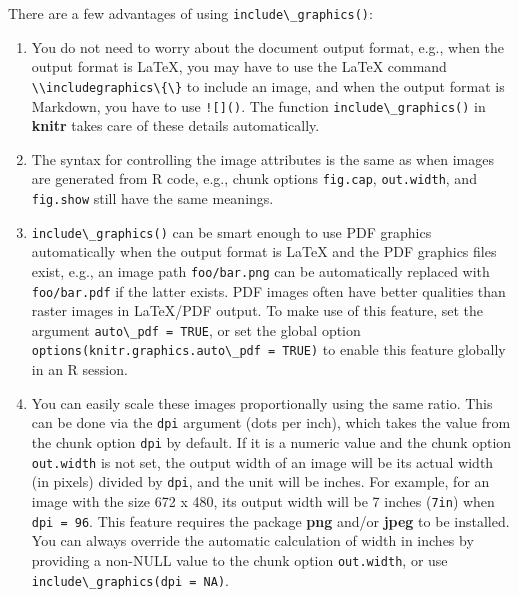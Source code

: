 \documentclass[doctor,openright,twoside]{sjtuthesis}
\providecommand{\tightlist}{%
    \setlength{\itemsep}{0pt}\setlength{\parskip}{0pt}}
\newcommand{\passthrough}[1]{#1}
\theoremstyle{plain}
\theoremstyle{definition}
\theoremstyle{remark}
\theoremstyle{ocrenumbox}
\theoremstyle{plain}
\begin{document}
There are a few advantages of using \passthrough{\lstinline!include\_graphics()!}:

\begin{enumerate}
\def\labelenumi{\arabic{enumi}.}
\tightlist
\item
  You do not need to worry about the document output format, e.g., when the output format is LaTeX, you may have to use the LaTeX command \passthrough{\lstinline!\\includegraphics\{\}!} to include an image, and when the output format is Markdown, you have to use \passthrough{\lstinline"![]()"}. The function \passthrough{\lstinline!include\_graphics()!} in \textbf{knitr} takes care of these details automatically.
\item
  The syntax for controlling the image attributes is the same as when images are generated from R code, e.g., chunk options \passthrough{\lstinline!fig.cap!}, \passthrough{\lstinline!out.width!}, and \passthrough{\lstinline!fig.show!} still have the same meanings.
\item
  \passthrough{\lstinline!include\_graphics()!} can be smart enough to use PDF graphics automatically when the output format is LaTeX and the PDF graphics files exist, e.g., an image path \passthrough{\lstinline!foo/bar.png!} can be automatically replaced with \passthrough{\lstinline!foo/bar.pdf!} if the latter exists. PDF images often have better qualities than raster images in LaTeX/PDF output. To make use of this feature, set the argument \passthrough{\lstinline!auto\_pdf = TRUE!}, or set the global option \passthrough{\lstinline!options(knitr.graphics.auto\_pdf = TRUE)!} to enable this feature globally in an R session.
\item
  You can easily scale these images proportionally using the same ratio. This can be done via the \passthrough{\lstinline!dpi!} argument (dots per inch), which takes the value from the chunk option \passthrough{\lstinline!dpi!} by default. If it is a numeric value and the chunk option \passthrough{\lstinline!out.width!} is not set, the output width of an image will be its actual width (in pixels) divided by \passthrough{\lstinline!dpi!}, and the unit will be inches. For example, for an image with the size 672 x 480, its output width will be 7 inches (\passthrough{\lstinline!7in!}) when \passthrough{\lstinline!dpi = 96!}. This feature requires the package \textbf{png} and/or \textbf{jpeg} to be installed. You can always override the automatic calculation of width in inches by providing a non-NULL value to the chunk option \passthrough{\lstinline!out.width!}, or use \passthrough{\lstinline!include\_graphics(dpi = NA)!}.
\end{enumerate}
\end{document}
